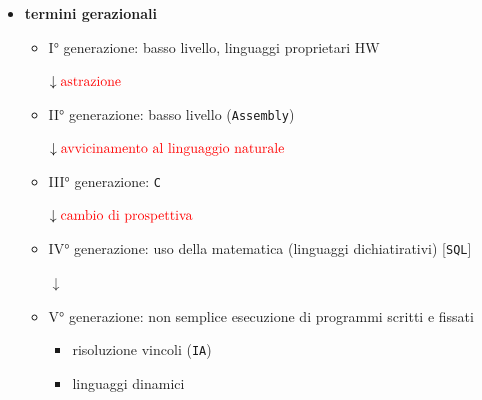 \begin{itemize}[label=$\circ$, itemsep=\medskipamount]
\begin{itemize}[itemsep=\smallskipamount]
        Un linguaggio deve avere tre proprietà:
        \begin{itemize}[itemsep=\smallskipamount]
            \item incapsulamento
            \item eriditarietà
            \item polimorfismo
        \end{itemize}
        \item linguaggi dichiatirativi: basati su componenti della matematica
        \begin{itemize}[itemsep=\smallskipamount]
            \item logici: basati sulla logica proposizionale del primo ordine, in cui si effettuano calcoli tramite dimostrazione di fatti (es. $\verb|PROLOG|$)
            \item matematici: basati sul concetto di applicazione di funzione (es. $\verb|LSIP|$, $\verb|ML|$)
        \end{itemize}
    \end{itemize}
    \item \textbf{termini gerazionali}
    \begin{itemize}[itemsep=\smallskipamount]
        \item I° generazione: basso livello, linguaggi proprietari HW
        \begin{center}
            $\downarrow \textcolor{red}{\text{astrazione}}$
        \end{center}
        \item II° generazione: basso livello (\texttt{Assembly})
        \begin{center}
            $\downarrow \textcolor{red}{\text{avvicinamento al linguaggio naturale}}$
        \end{center}
        \item III° generazione: \texttt{C}
        \begin{center}
            $\downarrow \textcolor{red}{\text{cambio di prospettiva}}$
        \end{center}
        \item IV° generazione: uso della matematica (linguaggi dichiatirativi) [\texttt{SQL}]
        \begin{center}
            $\downarrow$
        \end{center}
        \item V° generazione: non semplice esecuzione di programmi scritti e fissati
        \begin{itemize}[itemsep=\smallskipamount]
            \item risoluzione vincoli (\texttt{IA})
            \item linguaggi dinamici
        \end{itemize}
    \end{itemize}
\end{itemize}

